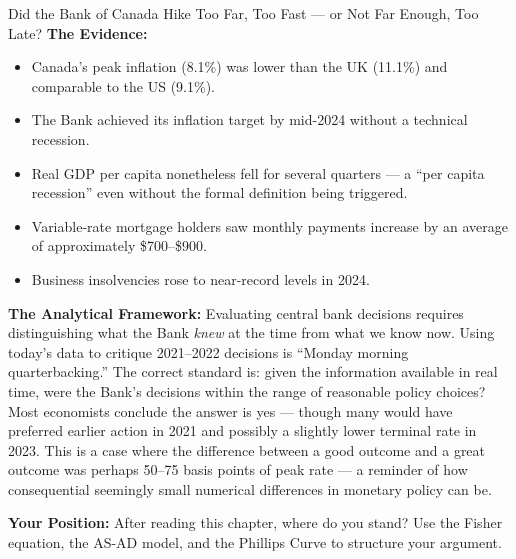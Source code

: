 \begin{policydebate}{Did the Bank of Canada Hike Too Far, Too Fast --- or Not Far Enough, Too Late?}
\textbf{The Evidence:}
\begin{itemize}
  \item Canada's peak inflation (8.1\%) was lower than the UK (11.1\%)
        and comparable to the US (9.1\%).
  \item The Bank achieved its inflation target by mid-2024 without a
        technical recession.
  \item Real GDP per capita nonetheless fell for several quarters ---
        a ``per capita recession'' even without the formal definition
        being triggered.
  \item Variable-rate mortgage holders saw monthly payments increase
        by an average of approximately \$700--\$900.
  \item Business insolvencies rose to near-record levels in 2024.
\end{itemize}

\textbf{The Analytical Framework:}
Evaluating central bank decisions requires distinguishing what the Bank
\textit{knew} at the time from what we know now. Using today's data to
critique 2021--2022 decisions is ``Monday morning quarterbacking.'' The
correct standard is: given the information available in real time, were
the Bank's decisions within the range of reasonable policy choices?
Most economists conclude the answer is yes --- though many would have
preferred earlier action in 2021 and possibly a slightly lower terminal
rate in 2023. This is a case where the difference between a good outcome
and a great outcome was perhaps 50--75 basis points of peak rate ---
a reminder of how consequential seemingly small numerical differences
in monetary policy can be.

\textbf{Your Position:} After reading this chapter, where do you stand?
Use the Fisher equation, the AS-AD model, and the Phillips Curve to
structure your argument.
\end{policydebate}

